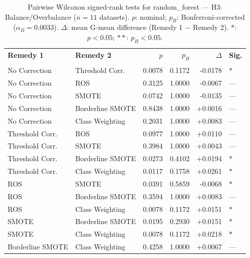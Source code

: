 \begin{table}[ht]
\centering
\scriptsize
\caption{Pairwise Wilcoxon signed-rank tests for random_forest --- H3: Balance/Overbalance ($n=11$ datasets). $p$: nominal; $p_B$: Bonferroni-corrected ($\alpha_B=0.0033$). $\Delta$: mean G-mean difference (Remedy 1 $-$ Remedy 2). $\ast$: $p<0.05$; $\ast\ast$: $p_B<0.05$.}
\label{tab:wilcoxon_random_forest_h3}
\begin{tabular}{llrrrl}
\toprule
\textbf{Remedy 1} & \textbf{Remedy 2} & \textbf{$p$} & \textbf{$p_B$} & \textbf{$\Delta$} &  \textbf{Sig.} \\\\
\midrule
    No Correction & Threshold Corr. & 0.0078 & 0.1172 & -0.0178 & $\ast$ \\
    No Correction & ROS & 0.3125 & 1.0000 & -0.0067 & --- \\
    No Correction & SMOTE & 0.0742 & 1.0000 & -0.0135 & --- \\
    No Correction & Borderline SMOTE & 0.8438 & 1.0000 & +0.0016 & --- \\
    No Correction & Class Weighting & 0.2031 & 1.0000 & +0.0083 & --- \\
    Threshold Corr. & ROS & 0.0977 & 1.0000 & +0.0110 & --- \\
    Threshold Corr. & SMOTE & 0.3984 & 1.0000 & +0.0043 & --- \\
    Threshold Corr. & Borderline SMOTE & 0.0273 & 0.4102 & +0.0194 & $\ast$ \\
    Threshold Corr. & Class Weighting & 0.0117 & 0.1758 & +0.0261 & $\ast$ \\
    ROS & SMOTE & 0.0391 & 0.5859 & -0.0068 & $\ast$ \\
    ROS & Borderline SMOTE & 0.3594 & 1.0000 & +0.0083 & --- \\
    ROS & Class Weighting & 0.0078 & 0.1172 & +0.0151 & $\ast$ \\
    SMOTE & Borderline SMOTE & 0.0195 & 0.2930 & +0.0151 & $\ast$ \\
    SMOTE & Class Weighting & 0.0078 & 0.1172 & +0.0218 & $\ast$ \\
    Borderline SMOTE & Class Weighting & 0.4258 & 1.0000 & +0.0067 & --- \\
\bottomrule
\end{tabular}
\end{table}